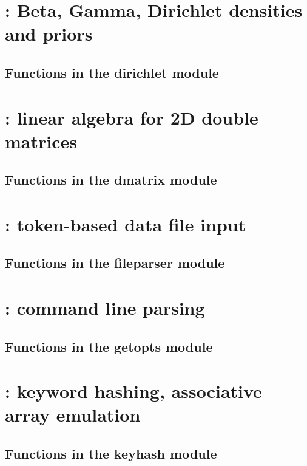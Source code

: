 \documentclass[10pt]{book}
\begin{document}
\newpage
\section{: Beta, Gamma, Dirichlet densities and priors}

\subsection{Functions in the dirichlet module}


\newpage
\section{: linear algebra for 2D double matrices}
%
\subsection{Functions in the dmatrix module}


\newpage
\section{: token-based data file input}

\subsection{Functions in the fileparser module}


\newpage
\section{: command line parsing}

\subsection{Functions in the getopts module}


\newpage
\section{: keyword hashing, associative array emulation}

\subsection{Functions in the keyhash module}

\end{document}
